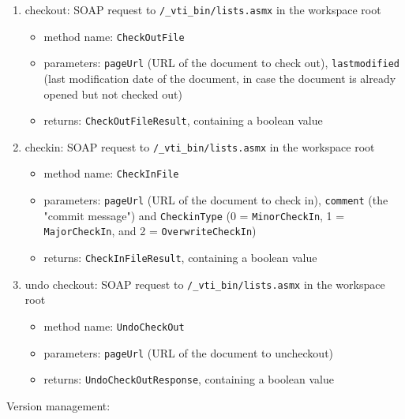 \begin{enumerate}
\item checkout: SOAP request to \texttt{/\_vti\_bin/lists.asmx} in the workspace root
\begin{itemize}
\item method name: \texttt{CheckOutFile}
\item parameters: \texttt{pageUrl} (URL of the document to check out), \texttt{lastmodified} (last modification date of the document, in case the document is already opened but not checked out)
\item returns: \texttt{CheckOutFileResult}, containing a boolean value
\end{itemize}

\item checkin: SOAP request to \texttt{/\_vti\_bin/lists.asmx} in the workspace root
\begin{itemize}
\item method name: \texttt{CheckInFile}
\item parameters: \texttt{pageUrl} (URL of the document to check in), \texttt{comment} (the "commit message") and \texttt{CheckinType} (0 = \texttt{MinorCheckIn}, 1 = \texttt{MajorCheckIn}, and 2 = \texttt{OverwriteCheckIn})
\item returns: \texttt{CheckInFileResult}, containing a boolean value
\end{itemize}

\item undo checkout: SOAP request to \texttt{/\_vti\_bin/lists.asmx} in the workspace root
\begin{itemize}
\item method name: \texttt{UndoCheckOut}
\item parameters: \texttt{pageUrl} (URL of the document to uncheckout)
\item returns: \texttt{UndoCheckOutResponse}, containing a boolean value
\end{itemize}
\end{enumerate}

Version management:

